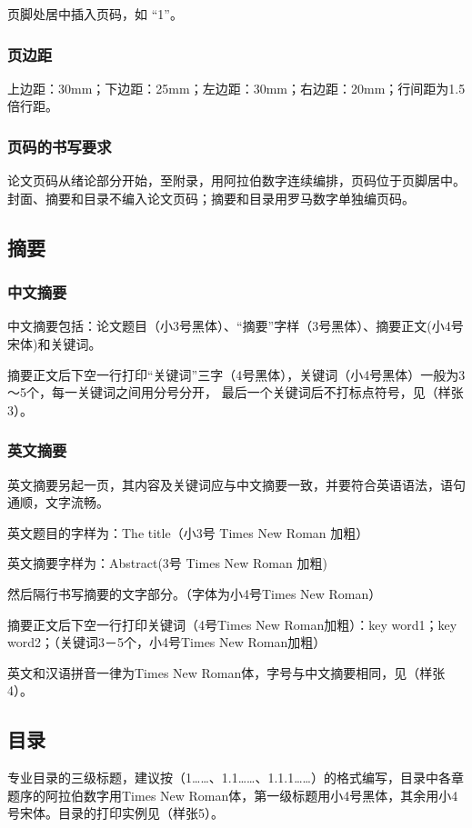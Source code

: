         页脚处居中插入页码，如 “1”。
    \subsubsection{页边距}
        上边距：30mm；下边距：25mm；左边距：30mm；右边距：20mm；行间距为1.5倍行距。
    \subsubsection{页码的书写要求}
        论文页码从绪论部分开始，至附录，用阿拉伯数字连续编排，页码位于页脚居中。封面、摘要和目录不编入论文页码；摘要和目录用罗马数字单独编页码。
    
    \subsection{摘要}
    \subsubsection{中文摘要}
        中文摘要包括：论文题目（小3号黑体）、“摘要”字样（3号黑体）、摘要正文(小4号宋体)和关键词。

        摘要正文后下空一行打印“关键词”三字（4号黑体），关键词（小4号黑体）一般为3～5个，每一关键词之间用分号分开，
        最后一个关键词后不打标点符号，见（样张3）。

    \subsubsection{英文摘要}
        英文摘要另起一页，其内容及关键词应与中文摘要一致，并要符合英语语法，语句通顺，文字流畅。

        英文题目的字样为：The title（小3号 Times New Roman 加粗）

        英文摘要字样为：Abstract(3号 Times New Roman 加粗)

        然后隔行书写摘要的文字部分。（字体为小4号Times New Roman）

        摘要正文后下空一行打印关键词（4号Times New Roman加粗）：key word1；key word2；（关键词3－5个，小4号Times New Roman加粗）

        英文和汉语拼音一律为Times New Roman体，字号与中文摘要相同，见（样张4）。
    \subsection{目录}
    专业目录的三级标题，建议按（1……、1.1……、1.1.1……）的格式编写，目录中各章题序的阿拉伯数字用Times New Roman体，第一级标题用小4号黑体，其余用小4号宋体。目录的打印实例见（样张5）。

